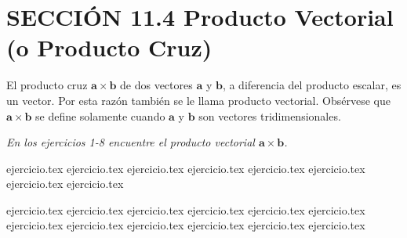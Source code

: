 
\section*{SECCIÓN 11.4 \quad Producto Vectorial (o Producto Cruz)}

\noindent {}

\vspace{0.3cm}
El producto cruz $\mathbf{a} \times \mathbf{b}$ de dos vectores $\mathbf{a}$ y $\mathbf{b}$, a diferencia del producto escalar, es un vector. Por esta razón también se le llama producto vectorial. Obsérvese que $\mathbf{a} \times \mathbf{b}$ se define solamente cuando $\mathbf{a}$ y $\mathbf{b}$ son vectores tridimensionales.

\vspace{0.5cm}
\noindent\textit{En los ejercicios 1-8 encuentre el producto vectorial $\mathbf{a} \times \mathbf{b}$.}

\begin{enumerate}
    {ejercicio.tex}
{ejercicio.tex}
{ejercicio.tex}
{ejercicio.tex}
{ejercicio.tex}
{ejercicio.tex}
{ejercicio.tex}
{ejercicio.tex}
\end{enumerate}

\vspace{0.3cm}
\begin{enumerate}
    \setcounter{enumi}{8}
    {ejercicio.tex}
{ejercicio.tex}
{ejercicio.tex}
{ejercicio.tex}
{ejercicio.tex}
{ejercicio.tex}
{ejercicio.tex}
{ejercicio.tex}
{ejercicio.tex}
{ejercicio.tex}
{ejercicio.tex}
{ejercicio.tex}
\end{enumerate}

